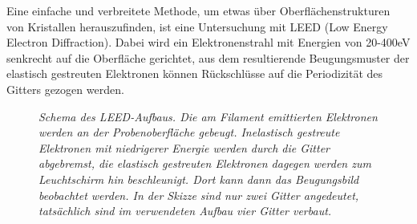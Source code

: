 \FloatBarrier

Eine einfache und verbreitete Methode, um etwas über Oberflächenstrukturen von
 Kristallen herauszufinden, ist eine Untersuchung mit LEED (Low Energy Electron
 Diffraction).
 Dabei wird ein Elektronenstrahl mit Energien von 20-400eV senkrecht auf die
 Oberfläche gerichtet, aus dem resultierende Beugungsmuster der elastisch
 gestreuten Elektronen können Rückschlüsse auf die Periodizität des Gitters
 gezogen werden.


 \begin{figure}[H]
	\centering
	\sffamily 
	
	\caption{\textit{Schema des LEED-Aufbaus. Die am Filament emittierten Elektronen werden an der
	Probenoberfläche gebeugt. Inelastisch gestreute Elektronen mit niedrigerer Energie werden durch die
	Gitter abgebremst, die elastisch gestreuten Elektronen dagegen werden zum Leuchtschirm
	hin beschleunigt. Dort kann dann das Beugungsbild beobachtet werden. In der Skizze sind nur zwei
	Gitter angedeutet, tatsächlich sind im verwendeten Aufbau vier Gitter verbaut.}}
	\label{leedaufbau}
\end{figure}




